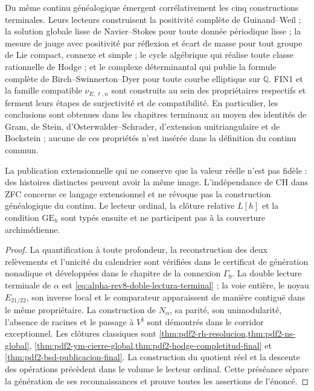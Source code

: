 \begin{theorem}
Du même continu généalogique émergent corrélativement les cinq
constructions terminales. Leurs lecteurs construisent la positivité complète
de Guinand--Weil ; la solution globale lisse de Navier--Stokes pour toute donnée
périodique lisse ; la mesure de jauge avec positivité par réflexion et écart de
masse pour tout groupe de Lie compact, connexe et simple ; le cycle algébrique
qui réalise toute classe rationnelle de Hodge ; et le complexe déterminantal qui
publie la formule complète de Birch--Swinnerton--Dyer pour toute courbe
elliptique sur \(\mathbb Q\). FIN1 et la famille compatible
\(\nu_{E,\ell,n}\) sont construits au sein des propriétaires respectifs et
ferment leurs étapes de surjectivité et de compatibilité. En particulier, les conclusions sont obtenues dans les chapitres
terminaux au moyen des identités
de Gram, de Stein, d'Osterwalder--Schrader, d'extension unitriangulaire et de Bockstein ;
aucune de ces propriétés n'est insérée dans la définition du continu commun.

La publication extensionnelle qui ne conserve que la valeur réelle n'est pas fidèle :
des histoires distinctes peuvent avoir la même image. L'indépendance de CH dans
ZFC concerne ce langage extensionnel et ne révoque pas la construction
généalogique du continu. Le lecteur ordinal, la clôture relative \(L[h]\)
et la condition \(\mathrm{GE}_h\) sont typés ensuite et ne participent pas à la
couverture archimédienne.
\end{theorem}

\begin{proof}
La quantification à toute profondeur, la reconstruction des deux
relèvements et l'unicité du calendrier sont vérifiées dans le certificat
de génération nonadique et développées dans le chapitre de la connexion
\(\Gamma_9\). La double lecture terminale de \(\alpha\) est
\eqref{eq:alpha-rev8-doble-lectura-terminal} ; la voie entière, le noyau
\(E_{21/22}\), son inverse local et le comparateur apparaissent de manière contiguë dans
le même propriétaire. La construction de \(N_\alpha\), sa parité,
son unimodularité, l'absence de racines et le passage à \(V^\natural\) sont démontrés dans
le corridor exceptionnel. Les clôtures classiques sont
\cref{thm:pdf2-rh-resolucion,thm:pdf2-ns-global},
\cref{thm:pdf2-ym-cierre-global,thm:pdf2-hodge-completitud-final} et
\cref{thm:pdf2-bsd-publicacion-final}. La construction du quotient réel et la
descente des opérations précèdent dans le volume le lecteur ordinal. Cette
préséance sépare la génération de ses reconnaissances et prouve toutes les
assertions de l'énoncé.
\end{proof}


